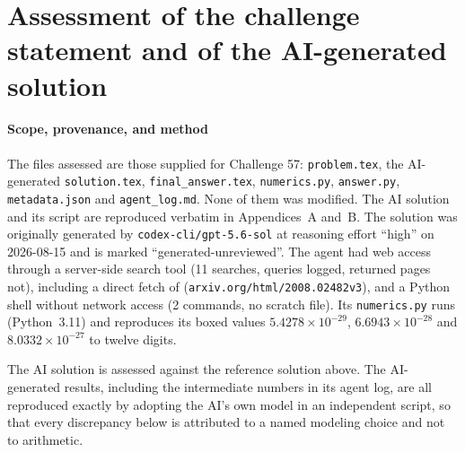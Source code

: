 \clearpage
\section*{Assessment of the challenge statement and of the AI-generated solution}

\paragraph*{Scope, provenance, and method}
The files assessed are those supplied for Challenge 57: \texttt{problem.tex}, the AI-generated \texttt{solution.tex}, \texttt{final\_answer.tex}, \texttt{numerics.py}, \texttt{answer.py}, \texttt{metadata.json} and \texttt{agent\_log.md}. None of them was modified. The AI solution and its script are reproduced verbatim in Appendices~A and~B. The solution was originally generated by \texttt{codex-cli/gpt-5.6-sol} at reasoning effort ``high'' on 2026-08-15 and is marked ``generated-unreviewed''. The agent had web access through a server-side search tool (11 searches, queries logged, returned pages not), including a direct fetch of \citet{Michimura2020} (\texttt{arxiv.org/html/2008.02482v3}), and a Python shell without network access (2 commands, no scratch file). Its \texttt{numerics.py} runs (Python~3.11) and reproduces its boxed values $5.4278\times10^{-29}$, $6.6943\times10^{-28}$ and $8.0332\times10^{-27}$ to twelve digits.

The AI solution is assessed against the reference solution above. The AI-generated results, including the intermediate numbers in its agent log, are all reproduced exactly by adopting the AI's own model in an independent script, so that every discrepancy below is attributed to a named modeling choice and not to arithmetic.


